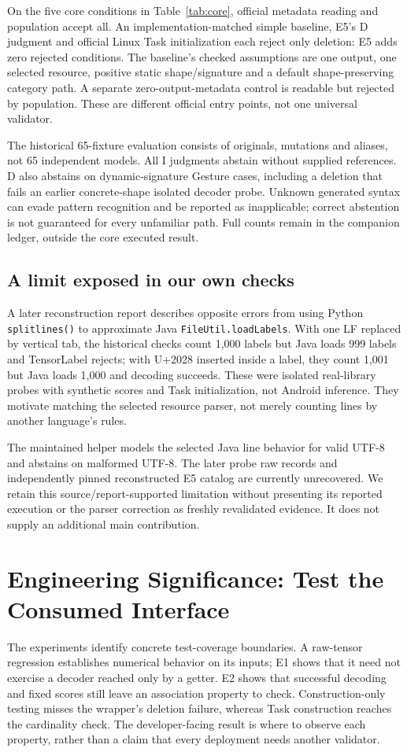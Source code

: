 \documentclass[10pt,conference]{IEEEtran}
\newcommand{\code}[1]{\texttt{#1}}
\begin{document}
On the five core conditions in Table~\ref{tab:core}, official metadata reading and population accept all. An implementation-matched simple baseline, E5's D judgment and official Linux Task initialization each reject only deletion: E5 adds zero rejected conditions. The baseline's checked assumptions are one output, one selected resource, positive static shape/signature and a default shape-preserving category path. A separate zero-output-metadata control is readable but rejected by population. These are different official entry points, not one universal validator.

The historical 65-fixture evaluation consists of originals, mutations and aliases, not 65 independent models. All I judgments abstain without supplied references. D also abstains on dynamic-signature Gesture cases, including a deletion that fails an earlier concrete-shape isolated decoder probe. Unknown generated syntax can evade pattern recognition and be reported as inapplicable; correct abstention is not guaranteed for every unfamiliar path. Full counts remain in the companion ledger, outside the core executed result.

\subsection{A limit exposed in our own checks}
A later reconstruction report describes opposite errors from using Python \code{splitlines()} to approximate Java \code{FileUtil.loadLabels}. With one LF replaced by vertical tab, the historical checks count 1,000 labels but Java loads 999 labels and TensorLabel rejects; with U+2028 inserted inside a label, they count 1,001 but Java loads 1,000 and decoding succeeds. These were isolated real-library probes with synthetic scores and Task initialization, not Android inference. They motivate matching the selected resource parser, not merely counting lines by another language's rules.

The maintained helper models the selected Java line behavior for valid UTF-8 and abstains on malformed UTF-8. The later probe raw records and independently pinned reconstructed E5 catalog are currently unrecovered. We retain this source/report-supported limitation without presenting its reported execution or the parser correction as freshly revalidated evidence. It does not supply an additional main contribution.

\section{Engineering Significance: Test the Consumed Interface}
\label{sec:discussion}
The experiments identify concrete test-coverage boundaries. A raw-tensor regression establishes numerical behavior on its inputs; E1 shows that it need not exercise a decoder reached only by a getter. E2 shows that successful decoding and fixed scores still leave an association property to check. Construction-only testing misses the wrapper's deletion failure, whereas Task construction reaches the cardinality check. The developer-facing result is where to observe each property, rather than a claim that every deployment needs another validator.
\end{document}
